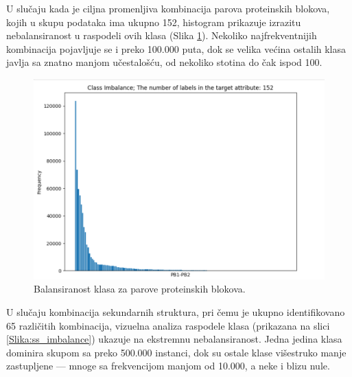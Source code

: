 \documentclass[a4paper,12pt]{article}
\begin{document}
U slučaju kada je ciljna promenljiva kombinacija parova proteinskih blokova, kojih u skupu podataka ima ukupno 152, histogram prikazuje izrazitu nebalansiranost u raspodeli ovih klasa (Slika \ref{Slika:pb_imbalance}). Nekoliko najfrekventnijih kombinacija pojavljuje se i preko 100.000 puta, dok se velika većina ostalih klasa javlja sa znatno manjom učestalošću, od nekoliko stotina do čak ispod 100.
\begin{figure}[htbp]
    \centering
    \includegraphics[width=1\textwidth]{./images/pb_imbalance.png}
    \caption{Balansiranost klasa za parove proteinskih blokova.}
    \label{Slika:pb_imbalance}
\end{figure}

U slučaju kombinacija sekundarnih struktura, pri čemu je ukupno identifikovano 65 različitih kombinacija, vizuelna analiza raspodele klasa (prikazana na slici \ref{Slika:ss_imbalance}) ukazuje na ekstremnu nebalansiranost. Jedna jedina klasa dominira skupom sa preko 500.000 instanci, dok su ostale klase višestruko manje zastupljene — mnoge sa frekvencijom manjom od 10.000, a neke i blizu nule.
\end{document}
